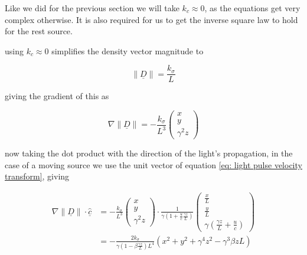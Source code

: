 Like we did for the previous section we will take $k_c \approx 0$, as the equations get very complex otherwise.
It is also required for us to get the inverse square law to hold for the rest source.

\begin{derivation}

	using $k_c \approx 0$ simplifies the density vector magnitude to

	\begin{equation}
		\| \underline{D} \| = \frac{k_\sigma}{L}
	\end{equation}

	giving the gradient of this as

	\begin{equation}
		\nabla \| \underline{D} \| = -\frac{k_\sigma}{L^3}
		\begin{pmatrix}
			x \\
			y \\
			\gamma^2 z
		\end{pmatrix}
	\end{equation}

	now taking the dot product with the direction of the light's propagation, in the case of a moving source we use the unit vector of equation \eqref{eq: light pulse velocity transform}, giving

	\begin{equation}
		\begin{aligned}
			\nabla \| \underline{D} \| \cdot \underline{\hat{c}}
			 & = -\frac{k_\sigma}{L^3}
			\begin{pmatrix}
				x \\
				y \\
				\gamma^2 z
			\end{pmatrix}
			\cdot
			\frac{1}{ \gamma \left( 1 + \frac{u}{c} \frac{\gamma {z}}{L} \right) }
			\begin{pmatrix}
				\frac{{x}}{L} \\
				\frac{{y}}{L} \\
				\gamma \left( \frac{\gamma {z}}{L} + \frac{u}{c} \right)
			\end{pmatrix}                                              \\
			 & = -\frac{2k_\sigma}{\gamma\left(1-\beta\frac{\gamma z}{L}\right)L^4} \left( x^2 + y^2 + \gamma^4 z^2 - \gamma^3 \beta z L \right)
		\end{aligned}
	\end{equation}

\end{derivation}




